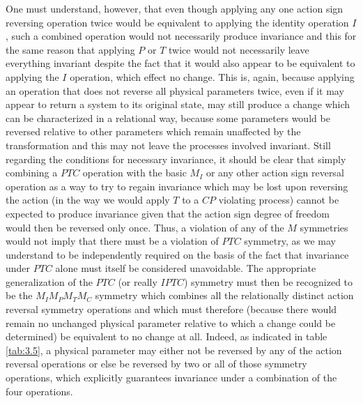 \documentclass[notitlepage,12pt]{report}
\begin{document}
One must understand, however, that even though applying any one action sign reversing operation twice would be equivalent to applying the identity operation $I$, such a combined operation would not necessarily produce invariance and this for the same reason that applying $P$ or $T$ twice would not necessarily leave everything invariant despite the fact that it would also appear to be equivalent to applying the $I$ operation, which effect no change. This is, again, because applying an operation that does not reverse all physical parameters twice, even if it may appear to return a system to its original state, may still produce a change which can be characterized in a relational way, because some parameters would be reversed relative to other parameters which remain unaffected by the transformation and this may not leave the processes involved invariant. Still regarding the conditions for necessary invariance, it should be clear that simply combining a $PTC$ operation with the basic $M_I$ or any other action sign reversal operation as a way to try to regain invariance which may be lost upon reversing the action (in the way we would apply $T$ to a $CP$ violating process) cannot be expected to produce invariance given that the action sign degree of freedom would then be reversed only once. Thus, a violation of any of the $M$ symmetries would not imply that there must be a violation of $PTC$ symmetry, as we may understand to be independently required on the basis of the fact that invariance under $PTC$ alone must itself be considered unavoidable. The appropriate generalization of the $PTC$ (or really $IPTC$) symmetry must then be recognized to be the $M_{I}M_{P}M_{T}M_{C}$ symmetry which combines all the relationally distinct action reversal symmetry operations and which must therefore (because there would remain no unchanged physical parameter relative to which a change could be determined) be equivalent to no change at all. Indeed, as indicated in table \ref{tab:3.5}, a physical parameter may either not be reversed by any of the action reversal operations or else be reversed by two or all of those symmetry operations, which explicitly guarantees invariance under a combination of the four operations.
\end{document}

